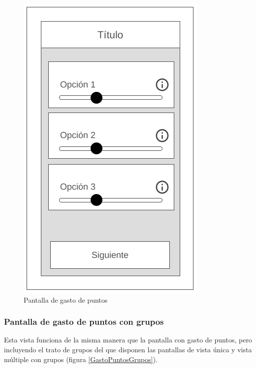 \begin{figure}[H]
    \centering
    \includegraphics[scale=0.4]{Figures/Mockups/Mock_GastoPuntos.png}
    \caption{Pantalla de gasto de puntos}
    \label{GastoPuntos}    
\end{figure}

\subsubsection{Pantalla de gasto de puntos con grupos}
Esta vista funciona de la misma manera que la pantalla con gasto de puntos, pero incluyendo el trato de grupos del 
que disponen las pantallas de vista única y vista múltiple con grupos (figura \ref*{GastoPuntosGrupos}).

